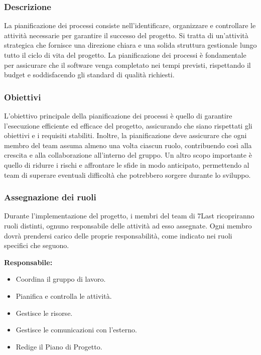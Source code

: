 \subsubsection{Descrizione}

La pianificazione dei processi consiste nell'identificare, organizzare e controllare le attività necessarie per garantire il successo del progetto. Si tratta di un'attività strategica che fornisce una direzione chiara e una solida struttura gestionale lungo tutto il ciclo di vita del progetto. La pianificazione dei processi è fondamentale per assicurare che il software venga completato nei tempi previsti, rispettando il budget e soddisfacendo gli standard di qualità richiesti.

\subsubsection{Obiettivi}

L’obiettivo principale della pianificazione dei processi è quello di garantire l'esecuzione efficiente ed efficace del progetto, assicurando che siano rispettati gli obiettivi e i requisiti stabiliti. Inoltre, la pianificazione deve assicurare che ogni membro del team assuma almeno una volta ciascun ruolo, contribuendo così alla crescita e alla collaborazione all'interno del gruppo. Un altro scopo importante è quello di ridurre i rischi e affrontare le sfide in modo anticipato, permettendo al team di superare eventuali difficoltà che potrebbero sorgere durante lo sviluppo.

\subsubsection{Assegnazione dei ruoli}

Durante l'implementazione del progetto, i membri del team di 7Last ricopriranno ruoli distinti, ognuno responsabile delle attività ad esso assegnate. Ogni membro dovrà prendersi carico delle proprie responsabilità, come indicato nei ruoli specifici che seguono.

\textbf{Responsabile:}
\begin{itemize}
    \item Coordina il gruppo di lavoro.
    \item Pianifica e controlla le attività.
    \item Gestisce le risorse.
    \item Gestisce le comunicazioni con l’esterno.
    \item Redige il Piano di Progetto.
\end{itemize}

